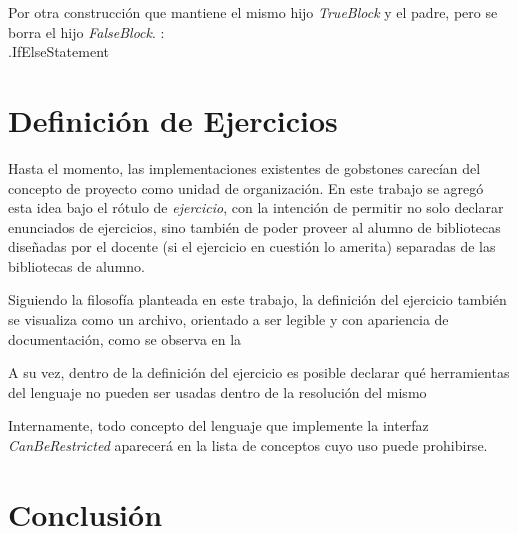 Por otra construcción que mantiene el mismo hijo \textit{TrueBlock} y el padre, pero se borra el hijo \textit{FalseBlock}.
\vspace{8mm}:
\\
.IfElseStatement
\bigskip

\section{Definición de Ejercicios}\label{proyecto}

Hasta el momento, las implementaciones existentes de gobstones carecían del concepto de proyecto como unidad de organización. En este trabajo se agregó esta idea bajo el rótulo de \emph{ejercicio}, con la intención de permitir no solo declarar enunciados de ejercicios, sino también de poder proveer al alumno de bibliotecas diseñadas por el docente (si el ejercicio en cuestión lo amerita) separadas de las bibliotecas de alumno.

Siguiendo la filosofía planteada en este trabajo, la definición del ejercicio también se visualiza como un archivo, orientado a ser legible y con apariencia de documentación, como se observa en la 


A su vez, dentro de la definición del ejercicio es posible declarar qué herramientas del lenguaje no pueden ser usadas dentro de la resolución del mismo 


Internamente, todo concepto del lenguaje que implemente la interfaz \textit{CanBeRestricted} aparecerá en la lista de conceptos cuyo uso puede prohibirse.

\section{Conclusión}\label{conclusion}

